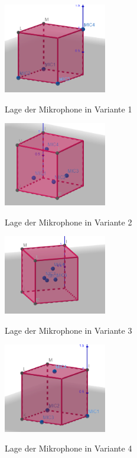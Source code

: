 \begin{figure}
\begin{minipage}[t]{0.33\linewidth}
\centering 
\includegraphics[width=0.4\textwidth]{MP1}
\caption{Lage der Mikrophone in Variante 1}\label{fig:Lage der Mikrophone Variante 1}
\includegraphics[width=0.4\textwidth]{MP2}
\caption{Lage der Mikrophone in Variante 2}\label{fig:Lage der Mikrophone in Variante 2}
\end{minipage}
\begin{minipage}[t]{0.33\linewidth}
\includegraphics[width=0.4\textwidth]{MP3}
\caption{Lage der Mikrophone in Variante 3}\label{fig:Lage der Mikrophone in Variante 3}
\includegraphics[width=0.4\textwidth]{MP4}
\caption{Lage der Mikrophone in Variante 4}\label{fig:Lage der Mikrophone Variante 4}

\end{minipage}
\end{figure}
